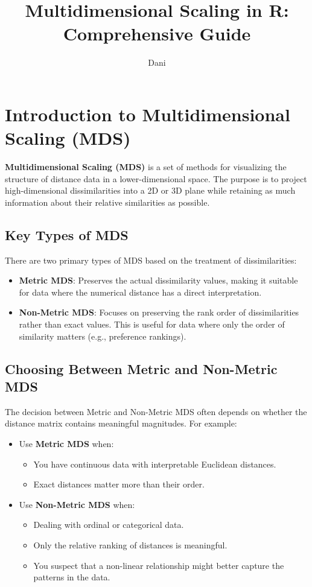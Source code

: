 \documentclass{article}
\title{Multidimensional Scaling in R: Comprehensive Guide}
\author{Dani}
\date{}
\begin{document}
\maketitle

\section{Introduction to Multidimensional Scaling (MDS)}
\textbf{Multidimensional Scaling (MDS)} is a set of methods for visualizing the structure of distance data in a lower-dimensional space. The purpose is to project high-dimensional dissimilarities into a 2D or 3D plane while retaining as much information about their relative similarities as possible.

\subsection{Key Types of MDS}
There are two primary types of MDS based on the treatment of dissimilarities:
\begin{itemize}
    \item \textbf{Metric MDS}: Preserves the actual dissimilarity values, making it suitable for data where the numerical distance has a direct interpretation.
    \item \textbf{Non-Metric MDS}: Focuses on preserving the rank order of dissimilarities rather than exact values. This is useful for data where only the order of similarity matters (e.g., preference rankings).
\end{itemize}

\subsection{Choosing Between Metric and Non-Metric MDS}
The decision between Metric and Non-Metric MDS often depends on whether the distance matrix contains meaningful magnitudes. For example:
\begin{itemize}
    \item Use \textbf{Metric MDS} when:
        \begin{itemize}
            \item You have continuous data with interpretable Euclidean distances.
            \item Exact distances matter more than their order.
        \end{itemize}
    \item Use \textbf{Non-Metric MDS} when:
        \begin{itemize}
            \item Dealing with ordinal or categorical data.
            \item Only the relative ranking of distances is meaningful.
            \item You suspect that a non-linear relationship might better capture the patterns in the data.
        \end{itemize}
\end{itemize}
\end{document}
